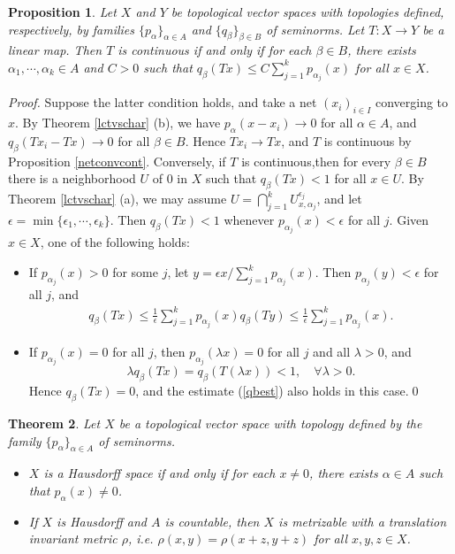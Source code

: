 \documentclass{article}
\numberwithin{equation}{section}
\theoremstyle{plain}
\newtheorem{theorem}{Theorem}[section]
\newtheorem{proposition}[theorem]{Proposition}
\theoremstyle{definition}
\begin{document}
\begin{proposition}
Let $X$ and $Y$ be topological vector spaces with topologies defined, respectively, by families $\{p_\alpha\}_{\alpha\in A}$ and $\{q_\beta\}_{\beta\in B}$ of seminorms. Let $T:X\to Y$ be a linear map. Then $T$ is continuous if and only if for each $\beta\in B$, there exists $\alpha_1,\cdots,\alpha_k\in A$ and $C>0$ such that $q_\beta(Tx)\leq C\sum_{j=1}^k p_{\alpha_j}(x)$ for all $x\in X$.
\end{proposition}
\textit{\hspace{-1.5em}Proof.} Suppose the latter condition holds, and take a net $(x_i)_{i\in I}$ converging to $x$. By Theorem \ref{lctvschar} (b), we have $p_\alpha(x-x_i)\to 0$ for all $\alpha\in A$, and $q_\beta(Tx_i-Tx)\to 0$ for all $\beta\in B$. Hence $Tx_i\to Tx$, and $T$ is continuous by Proposition \ref{netconvcont}. Conversely, if $T$ is continuous,then for every $\beta\in B$ there is a neighborhood $U$ of $0$ in $X$ such that $q_\beta(Tx)<1$ for all $x\in U$. By Theorem \ref{lctvschar} (a), we may assume $U=\bigcap_{j=1}^k U_{x,\alpha_j}^{\epsilon_j}$, and let $\epsilon=\min\{\epsilon_1,\cdots,\epsilon_k\}$. Then $q_\beta(Tx)<1$ whenever $p_{\alpha_j}(x)<\epsilon$ for all $j$. Given $x\in X$, one of the following holds:
\begin{itemize}
	\item If $p_{\alpha_j}(x)>0$ for some $j$, let $y=\epsilon x/\sum_{j=1}^k p_{\alpha_j}(x)$. Then $p_{\alpha_j}(y)<\epsilon$ for all $j$, and 
	\begin{align}
		q_\beta(Tx)\leq\frac{1}{\epsilon}\sum_{j=1}^k p_{\alpha_j}(x)q_\beta(Ty)\leq\frac{1}{\epsilon}\sum_{j=1}^k p_{\alpha_j}(x).\label{qbest}
	\end{align}
\item If $p_{\alpha_j}(x)=0$ for all $j$, then $p_{\alpha_j}(\lambda x)=0$ for all $j$ and all $\lambda>0$, and $$\lambda q_\beta(Tx)=q_\beta(T(\lambda x))<1,\quad\forall\lambda>0.$$ Hence $q_\beta(Tx)=0$, and the estimate (\ref{qbest}) also holds in this case.\qed
\end{itemize}
\newpage
\begin{theorem}\label{seminormlctvs}
Let $X$ be a topological vector space with topology defined by the family $\{p_\alpha\}_{\alpha\in A}$ of seminorms.
\begin{itemize}
\item[(i)] $X$ is a Hausdorff space if and only if for each $x\neq 0$, there exists $\alpha\in A$ such that $p_\alpha(x)\neq 0$.
\item[(ii)] If $X$ is Hausdorff and $A$ is countable, then $X$ is metrizable with a translation invariant metric $\rho$, i.e. $\rho(x,y)=\rho(x+z,y+z)$ for all $x,y,z\in X$.
\end{itemize}
\end{theorem}
\end{document}

